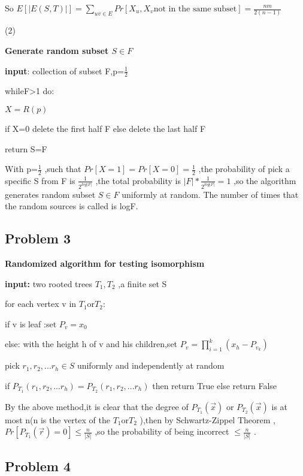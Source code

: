 \documentclass[]{article}
\begin{document}
So
\(E[|E(S,T)|]=\sum_{uv\in{E}}Pr[X_{u},X_{v}\text{not in the same subset}]=\frac{nm}{2(n-1)}\)

(2)


\textbf{Generate random subset \(S \in F\)}


\textbf{input}: collection of subset F,p=\(\frac{1}{2}\)


while\textbar{}F\textbar{}\textgreater{}1 do:

\(X=R(p)\)

if X=0 delete the first half F else delete the last half F

return S=F


With p=\(\frac{1}{2}\) ,such that \(Pr[X=1]=Pr[X=0]=\frac{1}{2}\) ,the
probability of pick a specific S from F is \(\frac{1}{2^{log|F|}}\) ,the
total probability is \(|F|*\frac{1}{2^{log|F|}}=1\) ,so the algorithm
generates random subset \(S \in F \) uniformly at random. The number of
times that the random sources is called is log\textbar{}F\textbar{}.

\hypertarget{header-n44}{%
\subsection{Problem 3}\label{header-n44}}


\textbf{Randomized algorithm for testing isomorphism}


\textbf{input:} two rooted trees \(T_{1},T_{2}\) ,a finite set S


for each vertex v in \(T_{1}\)or\(T_{2}\):

if v is leaf :set \(P_{v}=x_{0}\)

else: with the height h of v and his children,set
\(P_{v}=\prod_{i=1}^{k}(x_{h}-P_{v_{k}})\)

pick \(r_{1},r_{2},...r_{h} \in S\) uniformly and independently at
random

if \(P_{T_{1}}(r_{1},r_{2},...r_{h}) = P_{T_{2}}(r_{1},r_{2},...r_{h})\)
then return True else return False


By the above method,it is clear that the degree of
\( P_{T_{1}}(\vec{x})\) or \( P_{T_{2}}(\vec{x})\) is at most n(n is the
vertex of the \(T_{1}\)or\(T_{2} \) ),then by Schwartz-Zippel Theorem
,\(Pr[P_{T_{1}}(\vec{r})=0] \leq \frac{n}{|S|}\) ,so the probability of
being incorrect \(\leq \frac{n}{|S|}\) .

\hypertarget{header-n57}{%
\subsection{Problem 4}\label{header-n57}}
\end{document}

